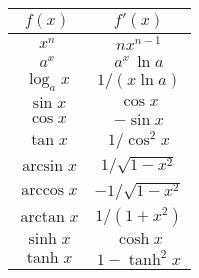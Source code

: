 \documentclass{article}
\begin{document}
\begin{table}[ht]
\begin{center}
    \begin{tabular}{|c|c|}
    \hline
    $f(x)$        & $f'(x)$           \\ \hline 
    $x^n$         & $nx^{n-1}$        \\ \hline
    $a^x$         & $a^x\,\ln{a}$     \\ \hline
    $\log_{a}{x}$ & $1/(x\ln{a})$     \\ \hline
    $\sin{x}$     & $\cos{x}$         \\ \hline
    $\cos{x}$     & $-\sin{x}$        \\ \hline
    $\tan{x}$     & $1/\cos^2{x}$     \\ \hline
    $\arcsin{x}$  & $1/\sqrt{1-x^2}$  \\ \hline
    $\arccos{x}$  & $-1/\sqrt{1-x^2}$ \\ \hline
    $\arctan{x}$  & $1/(1+x^2)$       \\ \hline
    $\sinh{x}$    & $\cosh{x}$        \\ \hline
    $\tanh{x}$    & $1-\tanh^2{x}$    \\ \hline
    \end{tabular}
\end{center}
\end{table}

















                                                
\end{document}
